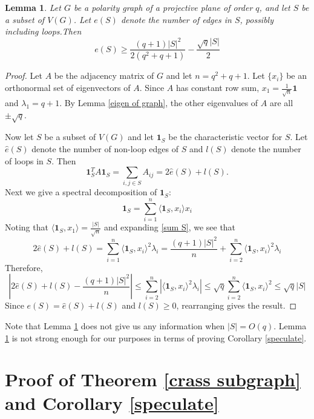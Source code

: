 \documentclass[12pt]{article}
\newtheorem{lemma}[theorem]{Lemma}
\begin{document}
\begin{lemma}\label{expander mixing lemma for ERq}
    Let $G$ be a polarity graph of a projective plane of order $q$, and let $S$ be a subset of $V(G)$.
    Let $e(S)$ denote the number of edges in $S$, possibly including loops.Then
    $$ e(S)\geq \frac{(q+1)|S|^2}{2(q^2+q+1)} - \frac{\sqrt{q}|S|}{2} $$
\end{lemma}

\begin{proof}
    Let $A$ be the adjacency matrix of $G$ and let $n=q^2+q+1$. Let $\{x_i\}$ be an orthonormal set of eigenvectors of $A$. Since $A$ has constant row sum, $x_1 = \frac{1}{\sqrt{n}} \mathbf{1}$ and $\lambda_1 = q+1$. By Lemma \ref{eigen of graph}, the other eigenvalues of $A$ are all $\pm \sqrt{q}$.


    Now let $S$ be a subset of $V(G)$ and let $\mathbf{1}_S$ be the characteristic vector for $S$. Let $\hat{e}(S)$ denote the number of non-loop edges of $S$ and $l(S)$ denote the number of loops in $S$. Then
    \begin{equation}\label{sum S}
        \mathbf{1}_S^T A \mathbf{1}_S = \sum_{i,j\in S} A_{ij} = 2\hat{e}(S) + l(S).
    \end{equation}
    Next we give a spectral decomposition of $\mathbf{1}_S$:
    $$\mathbf{1}_S = \sum_{i=1}^n \langle \mathbf{1}_S,x_i\rangle x_i $$
    Noting that $\langle \mathbf{1}_S, x_1\rangle = \frac{|S|}{\sqrt{n}}$ and expanding \eqref{sum S}, we see that
    $$ 2\hat{e}(S) + l(S) = \sum_{i=1}^n \langle \mathbf{1}_S, x_i\rangle^2 \lambda_i = \frac{(q+1)|S|^2}{n} + \sum_{i=2}^n \langle \mathbf{1}_S, x_i\rangle^2 \lambda_i $$
    Therefore,
    $$ \left|2 \hat{e}(S) + l(S) - \frac{(q+1)|S|^2}{n} \right| \leq \sum_{i=2}^n \left|\langle \mathbf{1}_S, x_i\rangle^2 \lambda_i \right| \leq \sqrt{q} \sum_{i=2}^n \langle \mathbf{1}_S, x_i\rangle^2 \leq \sqrt{q} |S| $$
    Since $e(S) = \hat{e}(S) + l(S)$ and $l(S)\geq 0$, rearranging gives the result.
\end{proof}



Note that Lemma \ref{expander mixing lemma for ERq} does not give us any information when $|S| = O( q)$.  Lemma \ref{expander mixing lemma for ERq} is not strong enough for our purposes in terms of proving Corollary \ref{speculate}.

\section{Proof of Theorem \ref{crass subgraph} and Corollary \ref{speculate}}\label{section 3}
\end{document}
